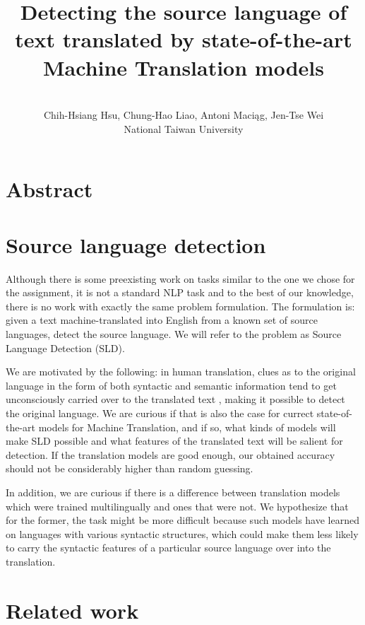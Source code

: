 \documentclass[twocolumn]{article}
\title{{\Huge \textbf{Detecting the source language of text translated by state-of-the-art Machine Translation models}} \\ }
\author{ \\ Chih-Hsiang Hsu, Chung-Hao Liao, Antoni Maciąg, Jen-Tse Wei \\ National Taiwan University}
\date{}
\begin{document}
\maketitle

\section*{Abstract}

\section*{Source language detection}

Although there is some preexisting work on tasks similar to the one we chose for the assignment, it is not a standard NLP task and to the best of our knowledge, there is no work with exactly the same problem formulation. The formulation is: given a text machine-translated into English from a known set of source languages, detect the source language. We will refer to the problem as Source Language Detection (SLD).

We are motivated by the following: in human translation, clues as to the original language in the form of both syntactic and semantic information tend to get unconsciously carried over to the translated text \cite{literary}, making it possible to detect the original language. We are curious if that is also the case for currect state-of-the-art models for Machine Translation, and if so, what kinds of models will make SLD possible and what features of the translated text will be salient for detection. If the translation models are good enough, our obtained accuracy should not be considerably higher than random guessing.

In addition, we are curious if there is a difference between translation models which were trained multilingually and ones that were not. We hypothesize that for the former, the task might be more difficult because such models have learned on languages with various syntactic structures, which could make them less likely to carry the syntactic features of a particular source language over into the translation.


\section*{Related work}
\end{document}
